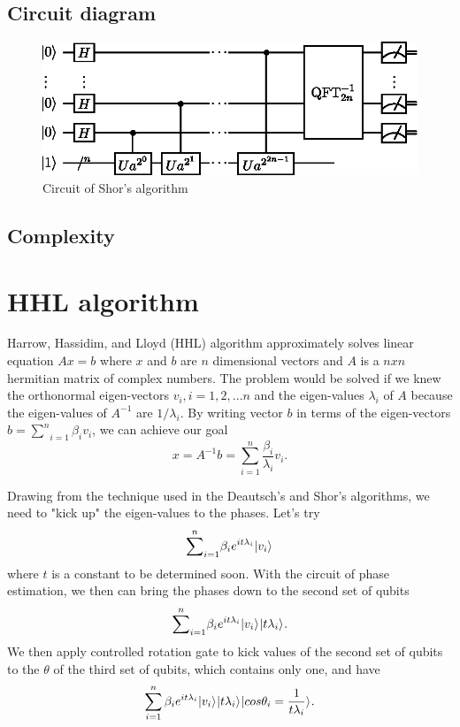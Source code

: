 \documentclass[oneside, letter, 12pt]{book}
\begin{document}
\subsection{Circuit diagram}
\begin{figure}[ht]
\includegraphics[width=12cm]{pic/Shor_algorithm.eps}
\caption{Circuit of Shor's algorithm}
\label{ShorAlgorithm}
\end{figure}

\subsection{Complexity}

\section{HHL algorithm}
Harrow, Hassidim, and Lloyd (HHL) algorithm approximately solves linear equation $A x = b$ where $x$ and $b$ are $n$ dimensional vectors and $A$ is a $n x n$ hermitian matrix of complex numbers. The problem would be solved if we knew the orthonormal eigen-vectors ${v_i}, i=1, 2, ...n$ and the eigen-values ${\lambda_i}$ of $A$ because the eigen-values of $A^{-1}$ are  ${1/\lambda_i}$. By writing vector $b$ in terms of the eigen-vectors $b = {\sum^n}_{i=1} \beta_i v_i$, we can achieve our goal
\begin{equation}
    x = A^{-1} b = \sum^{n}_{i=1} \frac {\beta_i} {\lambda_i} v_i .
\end{equation}

Drawing from the technique used in the Deautsch's and Shor's algorithms, we need to "kick up" the eigen-values to the phases. Let's try
\begin{equation}\label{hhl-1}
    {\sum^n}_{i=1} \beta_i e^{i t \lambda_i} \vert {v_i} \rangle_{}
\end{equation}
where $t$ is a constant to be determined soon. With the circuit of phase estimation, we then can bring the phases down to the second set of qubits
\begin{equation}\label{hhl-2}
    {\sum^n}_{i=1} \beta_i e^{i t \lambda_i} \vert {v_i} \rangle_{} \vert {t\lambda_i} \rangle_{}.
\end{equation}
We then apply controlled rotation gate to kick values of the second set of qubits to the $\theta$ of the third set of qubits, which contains only one, and have
\begin{equation}\label{hhl-3}
    \sum_{i=1}^n \beta_i e^{i t \lambda_i} \vert {v_i} \rangle_{} \vert {t\lambda_i} \rangle_{} \vert {cos\theta_i=\frac 1 {t\lambda_i}} \rangle_{}.
\end{equation}
\end{document}
